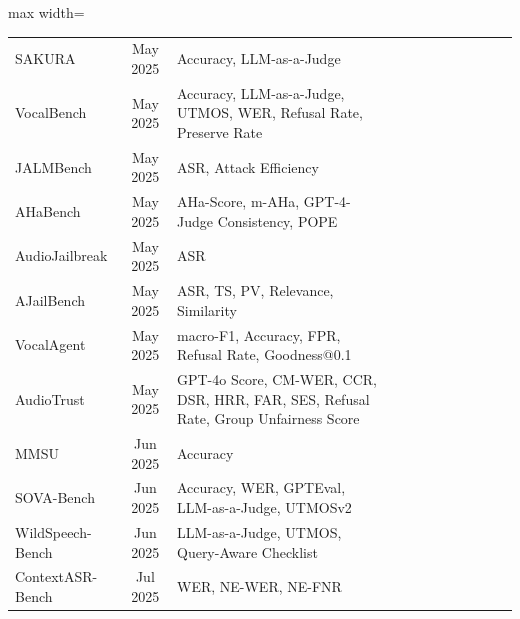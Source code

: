 \documentclass{llmxive}
\providecommand{\cmark}{\ding{51}}
\providecommand{\xmark}{\ding{55}}
\begin{document}
\begin{table}[htbp]
\begin{adjustbox}{max width=\textwidth}
\begin{tabular}{@{}lclccccccccc@{}}
SAKURA\cite{yang2025sakura}                  & May 2025 & Accuracy, LLM-as-a-Judge & \cmark & \cmark & \xmark & \xmark & \xmark & \xmark & \xmark & \xmark & \xmark \\
VocalBench\cite{liu2025vocalbench}             & May 2025 & Accuracy, LLM-as-a-Judge, UTMOS, WER, Refusal Rate, Preserve Rate & \cmark & \cmark & \cmark & \xmark & \xmark & \xmark & \cmark & \cmark & \xmark \\
JALMBench\cite{peng2025jalmbench}             & May 2025 & ASR, Attack Efficiency & \xmark & \xmark & \xmark & \xmark & \xmark & \xmark & \cmark & \xmark & \xmark \\
AHaBench\cite{cheng2026aha}             & May 2025 & AHa-Score, m-AHa, GPT-4-Judge Consistency, POPE & \xmark & \xmark & \cmark & \cmark & \xmark & \xmark & \xmark & \xmark & \xmark \\
AudioJailbreak\cite{chen2025audiojailbreak}  & May 2025 & ASR & \xmark & \xmark & \xmark & \xmark & \xmark & \xmark & \cmark & \xmark & \xmark \\
AJailBench\cite{song2025audio}            & May 2025 & ASR, TS, PV, Relevance, Similarity & \xmark & \xmark & \xmark & \xmark & \xmark & \xmark & \cmark & \xmark & \xmark \\
VocalAgent\cite{kim2025vocalagent}            & May 2025 & macro-F1, Accuracy, FPR, Refusal Rate, Goodness@0.1 & \cmark & \xmark & \xmark & \xmark & \xmark & \xmark & \xmark & \cmark & \xmark \\
AudioTrust\cite{li2025audiotrust}            & May 2025 & GPT-4o Score, CM-WER, CCR, DSR, HRR, FAR, SES, Refusal Rate, Group Unfairness Score & \xmark & \xmark & \xmark & \cmark & \cmark & \cmark & \cmark & \cmark & \cmark \\
MMSU\cite{wang2025mmsu}      & Jun 2025 & Accuracy & \cmark & \cmark & \xmark & \xmark & \xmark & \xmark & \xmark & \xmark & \xmark \\
SOVA-Bench\cite{hou2025sova}                    & Jun 2025 & Accuracy, WER, GPTEval, LLM-as-a-Judge, UTMOSv2 & \cmark & \cmark & \cmark & \xmark & \xmark & \xmark & \xmark & \xmark & \xmark \\
WildSpeech-Bench\cite{zhang2025wildspeechbench}       & Jun 2025 & LLM-as-a-Judge, UTMOS, Query-Aware Checklist & \cmark & \cmark & \cmark & \xmark & \xmark & \xmark & \xmark & \cmark & \xmark \\
ContextASR-Bench\cite{wang2025contextasr}      & Jul 2025 & WER, NE-WER, NE-FNR & \cmark & \xmark & \xmark & \xmark & \xmark & \xmark & \xmark & \xmark & \xmark \\

\end{tabular}
\end{adjustbox}
\end{table}
\end{document}
